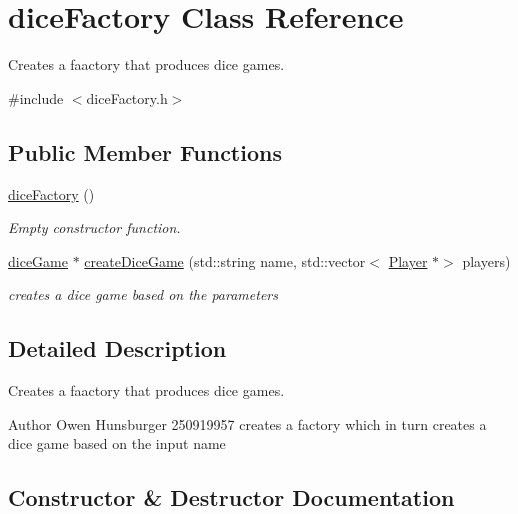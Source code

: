\hypertarget{classdiceFactory}{}\section{dice\+Factory Class Reference}
\label{classdiceFactory}


Creates a faactory that produces dice games.  




{\ttfamily \#include $<$dice\+Factory.\+h$>$}

\subsection*{Public Member Functions}
\begin{DoxyCompactItemize}
\item 
\hyperlink{classdiceFactory_ac4295df51faa766d54a2bde240c3f1a8}{dice\+Factory} ()
\begin{DoxyCompactList}\small\item\em Empty constructor function. \end{DoxyCompactList}\item 
\hyperlink{classdiceGame}{dice\+Game} $\ast$ \hyperlink{classdiceFactory_a591c320ac45d0919c9368ea867c856b9}{create\+Dice\+Game} (std\+::string name, std\+::vector$<$ \hyperlink{classPlayer}{Player} $\ast$$>$ players)
\begin{DoxyCompactList}\small\item\em creates a dice game based on the parameters \end{DoxyCompactList}\end{DoxyCompactItemize}


\subsection{Detailed Description}
Creates a faactory that produces dice games. 

\begin{DoxyAuthor}{Author}
Owen Hunsburger 250919957  creates a factory which in turn creates a dice game based on the input name 
\end{DoxyAuthor}


\subsection{Constructor \& Destructor Documentation}
\mbox{\label{classdiceFactory_ac4295df51faa766d54a2bde240c3f1a8}} 
